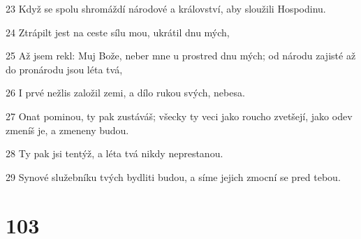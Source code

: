 \par 23 Když se spolu shromáždí národové a království, aby sloužili Hospodinu.
\par 24 Ztrápilt jest na ceste sílu mou, ukrátil dnu mých,
\par 25 Až jsem rekl: Muj Bože, neber mne u prostred dnu mých; od národu zajisté až do pronárodu jsou léta tvá,
\par 26 I prvé nežlis založil zemi, a dílo rukou svých, nebesa.
\par 27 Onat pominou, ty pak zustáváš; všecky ty veci jako roucho zvetšejí, jako odev zmeníš je, a zmeneny budou.
\par 28 Ty pak jsi tentýž, a léta tvá nikdy neprestanou.
\par 29 Synové služebníku tvých bydliti budou, a síme jejich zmocní se pred tebou.

\chapter{103}

